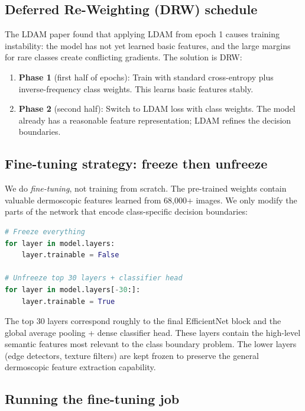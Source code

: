 \documentclass[12pt,a4paper]{article}
\begin{document}
\subsection{Deferred Re-Weighting (DRW) schedule}

The LDAM paper found that applying LDAM from epoch 1 causes training instability: the model
has not yet learned basic features, and the large margins for rare classes create conflicting
gradients. The solution is DRW:

\begin{enumerate}
  \item \textbf{Phase 1} (first half of epochs): Train with standard cross-entropy plus
    inverse-frequency class weights. This learns basic features stably.
  \item \textbf{Phase 2} (second half): Switch to LDAM loss with class weights. The model
    already has a reasonable feature representation; LDAM refines the decision boundaries.
\end{enumerate}

\subsection{Fine-tuning strategy: freeze then unfreeze}

We do \emph{fine-tuning}, not training from scratch. The pre-trained weights contain valuable
dermoscopic features learned from 68,000+ images. We only modify the parts of the network
that encode class-specific decision boundaries:

\begin{lstlisting}[language=Python]
# Freeze everything
for layer in model.layers:
    layer.trainable = False

# Unfreeze top 30 layers + classifier head
for layer in model.layers[-30:]:
    layer.trainable = True
\end{lstlisting}

The top 30 layers correspond roughly to the final EfficientNet block and the global average
pooling + dense classifier head. These layers contain the high-level semantic features most
relevant to the class boundary problem. The lower layers (edge detectors, texture filters)
are kept frozen to preserve the general dermoscopic feature extraction capability.

\subsection{Running the fine-tuning job}
\end{document}
